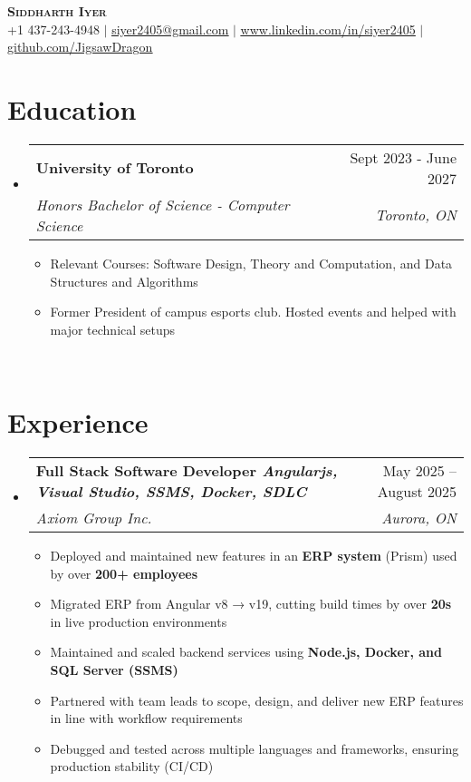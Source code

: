 \documentclass[letterpaper,11pt]{article}
\makeatletter
\newcommand{\resumeItem}[1]{
  \item\small{
    {#1 \vspace{-2pt}}
  }
}
\newcommand{\resumeSubheading}[4]{
  \vspace{-2pt}\item
    \begin{tabular*}{0.97\textwidth}[t]{l@{\extracolsep{\fill}}r}
      \textbf{#1} & #2 \\
      \textit{\small#3} & \textit{\small #4} \\
    \end{tabular*}\vspace{-7pt}
}
\newcommand{\resumeSubHeadingListStart}{\begin{itemize}[leftmargin=0.15in, label={}]}
\newcommand{\resumeSubHeadingListEnd}{\end{itemize}}
\newcommand{\resumeItemListStart}{\begin{itemize}}
\newcommand{\resumeItemListEnd}{\end{itemize}\vspace{-5pt}}
\makeatother
\begin{document}

\begin{center}
    \textbf{\Huge \scshape Siddharth Iyer} \\ \vspace{1pt}
    \small +1 437-243-4948 $|$ \href{mailto:x@x.com}{\underline{siyer2405@gmail.com}} $|$ 
    \href{https://linkedin.com/in/...}{\underline{www.linkedin.com/in/siyer2405}} $|$
    \href{https://github.com/...}{\underline{github.com/JigsawDragon}}
\end{center}


\section{Education}
  \resumeSubHeadingListStart
    \resumeSubheading
      {University of Toronto}{Sept 2023 - June 2027}
      {Honors Bachelor of Science -  Computer Science}{Toronto, ON}
    \resumeItemListStart
        \resumeItem{Relevant Courses: Software Design, Theory and Computation, and Data Structures and Algorithms}
        \resumeItem{Former President of campus esports club. Hosted events and helped with major technical setups}
    \resumeItemListEnd
    \resumeSubHeadingListEnd
\
\section{Experience}
\resumeSubHeadingListStart
    \resumeSubheading
      {Full Stack Software Developer \textnormal{\emph{Angularjs, Visual Studio, SSMS, Docker, SDLC}}}{ May 2025 -- August 2025}
      {Axiom Group Inc.}{Aurora, ON}
      \resumeItemListStart
      \resumeItem{Deployed and maintained new features in an \textbf{ERP system} (Prism) used by over \textbf{200+ employees}}
      \resumeItem{Migrated ERP from Angular v8 → v19, cutting build times by over \textbf{20s} in live production environments}
      \resumeItem{Maintained and scaled backend services using \textbf{Node.js, Docker, and SQL Server (SSMS)}}
      \resumeItem{Partnered with team leads to scope, design, and deliver new ERP features in line with workflow requirements}
      \resumeItem{Debugged and tested across multiple languages and frameworks, ensuring production stability (CI/CD)}
      \resumeItemListEnd
  \resumeSubHeadingListEnd
    
\end{document}
